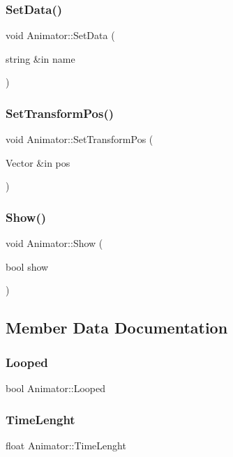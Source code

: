 \subsubsection{\texorpdfstring{Set\+Data()}{SetData()}}
{\footnotesize\ttfamily void Animator\+::\+Set\+Data (\begin{DoxyParamCaption}\item[{string \&in}]{name }\end{DoxyParamCaption})}

\hypertarget{class_animator_af014e225bedc9ebab69601959fbfe8f4}{}\label{class_animator_af014e225bedc9ebab69601959fbfe8f4} 
\subsubsection{\texorpdfstring{Set\+Transform\+Pos()}{SetTransformPos()}}
{\footnotesize\ttfamily void Animator\+::\+Set\+Transform\+Pos (\begin{DoxyParamCaption}\item[{Vector \&in}]{pos }\end{DoxyParamCaption})}

\hypertarget{class_animator_a2f550a3be2954440f927c9525c835dd7}{}\label{class_animator_a2f550a3be2954440f927c9525c835dd7} 
\subsubsection{\texorpdfstring{Show()}{Show()}}
{\footnotesize\ttfamily void Animator\+::\+Show (\begin{DoxyParamCaption}\item[{bool}]{show }\end{DoxyParamCaption})}



\subsection{Member Data Documentation}
\hypertarget{class_animator_ab711ada9ead963f5fb863294a3819924}{}\label{class_animator_ab711ada9ead963f5fb863294a3819924} 
\subsubsection{\texorpdfstring{Looped}{Looped}}
{\footnotesize\ttfamily bool Animator\+::\+Looped}

\hypertarget{class_animator_ab8beb1a0bb60e00f3d0f473fd46f386d}{}\label{class_animator_ab8beb1a0bb60e00f3d0f473fd46f386d} 
\subsubsection{\texorpdfstring{Time\+Lenght}{TimeLenght}}
{\footnotesize\ttfamily float Animator\+::\+Time\+Lenght}

